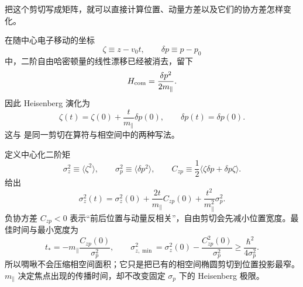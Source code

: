 把这个剪切写成矩阵，就可以直接计算位置、动量方差以及它们的协方差怎样变化。

在随中心电子移动的坐标
\[
\zeta\equiv z-v_0t,
\qquad
\delta p\equiv p-p_0
\]
中，二阶自由哈密顿量的线性漂移已经被消去，留下
\[
H_{\rm com}=\frac{\delta p^2}{2m_\parallel}.
\]
因此 Heisenberg 演化为
\begin{equation}
{
\zeta(t)=\zeta(0)+\frac{t}{m_\parallel}\delta p(0),
\qquad
\delta p(t)=\delta p(0).}
\label{eq:electron-shear-heisenberg}
\end{equation}
这与 是同一剪切在算符与相空间中的两种写法。

定义中心化二阶矩
\[
\sigma_z^2\equiv\langle\zeta^2\rangle,
\qquad
\sigma_p^2\equiv\langle\delta p^2\rangle,
\qquad
C_{zp}\equiv\frac12\langle\zeta\delta p+\delta p\zeta\rangle.
\]
 给出
\begin{equation}
{
\sigma_z^2(t)
=\sigma_z^2(0)+\frac{2t}{m_\parallel}C_{zp}(0)
+\frac{t^2}{m_\parallel^2}\sigma_p^2.}
\label{eq:electron_shear_variance}
\end{equation}
负协方差 $C_{zp}<0$ 表示“前后位置与动量反相关”，自由剪切会先减小位置宽度。最佳时间与最小宽度为
\begin{equation}
{
 t_*=-m_\parallel\frac{C_{zp}(0)}{\sigma_p^2},
\qquad
\sigma_{z,\min}^2
=\sigma_z^2(0)-\frac{C_{zp}^2(0)}{\sigma_p^2}
\ge\frac{\hbar^2}{4\sigma_p^2}.}
\label{eq:electron_chirp_compression_bound}
\end{equation}
所以啁啾不会压缩相空间面积；它只是把已有的相空间椭圆剪切到位置投影最窄。$m_\parallel$ 决定焦点出现的传播时间，却不改变固定 $\sigma_p$ 下的 Heisenberg 极限。

